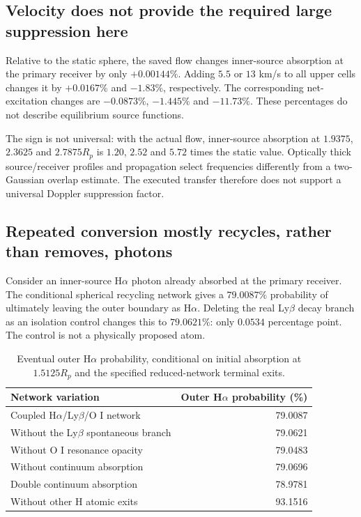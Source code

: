 \subsection{Velocity does not provide the required large suppression here}
Relative to the static sphere, the saved flow changes inner-source absorption
at the primary receiver by only $+0.00144\%$. Adding $5.5$ or $13$ km/s to all
upper cells changes it by $+0.0167\%$ and $-1.83\%$, respectively.
The corresponding net-excitation changes are $-0.0873\%$, $-1.445\%$ and
$-11.73\%$. These percentages do not describe equilibrium source functions.

The sign is not universal: with the actual flow, inner-source absorption at
$1.9375$, $2.3625$ and $2.7875R_p$ is $1.20$, $2.52$ and $5.72$ times the
static value. Optically thick source/receiver profiles and propagation select
frequencies differently from a two-Gaussian overlap estimate. The executed
transfer therefore does not support a universal Doppler suppression factor.

\subsection{Repeated conversion mostly recycles, rather than removes, photons}
Consider an inner-source H$\alpha$ photon already absorbed at the primary
receiver. The conditional spherical recycling network gives a $79.0087\%$
probability of ultimately leaving the outer boundary as H$\alpha$.
Deleting the real Ly$\beta$ decay branch as an isolation control changes this
to $79.0621\%$: only $0.0534$ percentage point. The control is not a physically
proposed atom.

\begin{table}[htbp]
\centering
\caption{Eventual outer H$\alpha$ probability, conditional on initial absorption
at $1.5125R_p$ and the specified reduced-network terminal exits.}
\begin{tabular}{lr}
\toprule
Network variation & Outer H$\alpha$ probability (\%)\\
\midrule
Coupled H$\alpha$/Ly$\beta$/O I network & 79.0087\\
Without the Ly$\beta$ spontaneous branch & 79.0621\\
Without O I resonance opacity & 79.0483\\
Without continuum absorption & 79.0696\\
Double continuum absorption & 78.9781\\
Without other H atomic exits & 93.1516\\
\bottomrule
\end{tabular}
\end{table}

